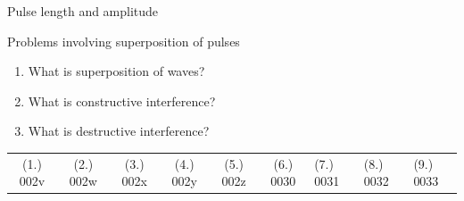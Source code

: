 \begin{Investigation}{Pulse length and amplitude }
\begin{exercises}{ Problems involving superposition of pulses }
\begin{enumerate}[noitemsep, label=\textbf{\arabic*}. ]
\begin{figure}[H]
 \end{figure}               \label{m38802*uid62}\item 
          What is superposition of waves?\newline
\label{m38802*uid64}\item What is constructive interference?\newline
\label{m38802*uid65}\item What is destructive interference?\newline
        \end{enumerate}
  \label{m38802*eip-812}
\par \practiceinfo
 \par \begin{tabular}[h]{cccccc}
 (1.) 002v  &  (2.) 002w  &  (3.) 002x  &  (4.) 002y  &  (5.) 002z  &  (6.) 0030  &  (7.) 0031  &  (8.) 0032  &  (9.) 0033  & \end{tabular}


\end{exercises}
\end{Investigation}
